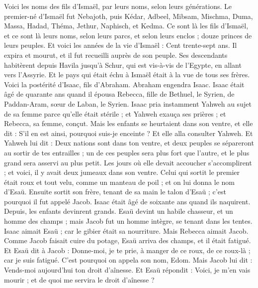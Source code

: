 \begin{multicols}{2}
Voici les noms des fils d'Ismaël, par leurs noms, selon leurs générations. Le premier-né d'Ismaël fut Nebajoth, puis Kédar, Adbeel, Mibsam,
Mischma, Duma, Massa,
Hadad, Théma, Jethur, Naphisch, et Kedma.
Ce sont là les fils d'Ismaël, et ce sont là leurs noms, selon leurs parcs, et selon leurs enclos ; douze princes de leurs peuples.
Et voici les années de la vie d'Ismaël : Cent trente-sept ans. Il expira et mourut, et il fut recueilli auprès de son peuple.
Ses descendants habitèrent depuis Havila jusqu'à Schur, qui est vis-à-vis de l'Egypte, en allant vers l'Assyrie. Et le pays qui était échu à Ismaël était à la vue de tous ses frères.
Voici la postérité d'Isaac, fils d'Abraham.
Abraham engendra Isaac. Isaac était âgé de quarante ans quand il épousa Rebecca, fille de Bethuel, le Syrien, de Paddan-Aram, sœur de Laban, le Syrien.
Isaac pria instamment Yahweh au sujet de sa femme parce qu'elle était stérile ; et Yahweh exauça ses prières ; et Rebecca, sa femme, conçut.
Mais les enfants se heurtaient dans son ventre, et elle dit : S'il en est ainsi, pourquoi suis-je enceinte ? Et elle alla consulter Yahweh.
Et Yahweh lui dit : Deux nations sont dans ton ventre, et deux peuples se sépareront au sortir de tes entrailles ; un de ces peuples sera plus fort que l'autre, et le plus grand sera asservi au plus petit.
Les jours où elle devait accoucher s’accomplirent ; et voici, il y avait deux jumeaux dans son ventre.
Celui qui sortit le premier était roux et tout velu, comme un manteau de poil ; et on lui donna le nom d’Esaü.
Ensuite sortit son frère, tenant de sa main le talon d'Esaü ; c'est pourquoi il fut appelé Jacob. Isaac était âgé de soixante ans quand ils naquirent.
Depuis, les enfants devinrent grands. Esaü devint un habile chasseur, et un homme des champs ; mais Jacob fut un homme intègre, se tenant dans les tentes.
Isaac aimait Esaü ; car le gibier était sa nourriture. Mais Rebecca aimait Jacob.
Comme Jacob faisait cuire du potage, Esaü arriva des champs, et il était fatigué.
Et Esaü dit à Jacob : Donne-moi, je te prie, à manger de ce roux, de ce roux-là ; car je suis fatigué. C'est pourquoi on appela son nom, Edom.
Mais Jacob lui dit : Vends-moi aujourd'hui ton droit d'aînesse.
Et Esaü répondit : Voici, je m'en vais mourir ; et de quoi me servira le droit d'aînesse ?

\end{multicols}
